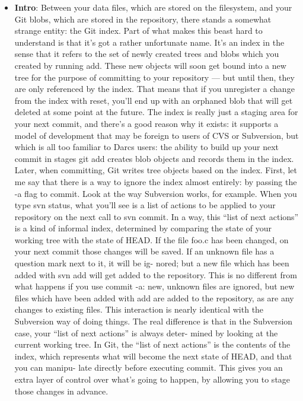 \documentclass{report}
\begin{document}
    \pagebreak 
    \begin{itemize}
        \item \textbf{Intro}: 
            Between your data files, which are stored on the filesystem, and your Git blobs, which are stored in the repository, there stands a somewhat strange entity: the Git index. Part of what makes this beast hard to understand is that it’s got a rather unfortunate name. It’s an index in the sense that it refers to the set of newly created trees and blobs which you created by running add. These new objects will soon get bound into a new tree for the purpose of committing to your repository — but until then, they are only referenced by the index. That means that if you unregister a change from the index with reset, you’ll end up with an orphaned blob that will get deleted at some point at the future.
            \bigbreak \noindent 
            The index is really just a staging area for your next commit, and there’s a good reason why it exists: it supports a model of development that may be foreign to users of CVS or Subversion, but which is all too familiar to Darcs users: the ability to build up your next commit in stages
            \bigbreak \noindent 
            git add creates blob objects and records them in the index. Later, when committing, Git writes tree objects based on the index.
            \bigbreak \noindent 
            \bigbreak \noindent 
            First, let me say that there is a way to ignore the index almost entirely: by passing the -a flag to commit. Look at the way Subversion works, for example. When you type svn status, what you’ll see is a list of actions to be applied to your repository on the next call to svn commit. In a way, this “list of next actions” is a kind of informal index, determined by comparing the state of your working tree with the state of HEAD. If the file foo.c has been changed, on your next commit those changes will be saved. If an unknown file has a question mark next to it, it will be ig- nored; but a new file which has been added with svn add will get added to the repository.
            \bigbreak \noindent 
            This is no different from what happens if you use commit -a: new, unknown files are ignored, but new files which have been added with add are added to the repository, as are any changes to existing files. This interaction is nearly identical with the Subversion way of doing things.
            \bigbreak \noindent 
            The real difference is that in the Subversion case, your “list of next actions” is always deter- mined by looking at the current working tree. In Git, the “list of next actions” is the contents of the index, which represents what will become the next state of HEAD, and that you can manipu- late directly before executing commit. This gives you an extra layer of control over what’s going to happen, by allowing you to stage those changes in advance.
    \end{itemize}
\end{document}
